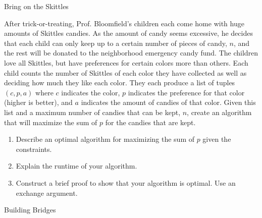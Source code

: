 \documentclass[10pt]{article}
\begin{document}
\thispagestyle{empty}
\handout


\begin{problem} Bring on the Skittles \end{problem}

After trick-or-treating, Prof. Bloomfield's children each come home with huge amounts of Skittles candies. As the amount of candy seems excessive, he decides that each child can only keep up to a certain number of pieces of candy, $n$, and the rest will be donated to the neighborhood emergency candy fund. The children love all Skittles, but have preferences for certain colors more than others. Each child counts the number of Skittles of each color they have collected as well as deciding how much they like each color. They each produce a list of tuples $(c, p, a)$  where $c$ indicates the color, $p$ indicates the preference for that color (higher is better), and $a$ indicates the amount of candies of that color. Given this list and a maximum number of candies that can be kept, $n$, create an algorithm that will maximize the sum of $p$ for the candies that are kept.

\begin{enumerate}
\item Describe an optimal algorithm for maximizing the sum of $p$ given the constraints. 
    
\solution{
}
    
\item Explain the runtime of your algorithm.

\solution{
}

\item Construct a brief proof to show that your algorithm is optimal. Use an exchange argument.

\solution{
}

\end{enumerate}


\begin{problem} Building Bridges\end{problem}
\end{document}
